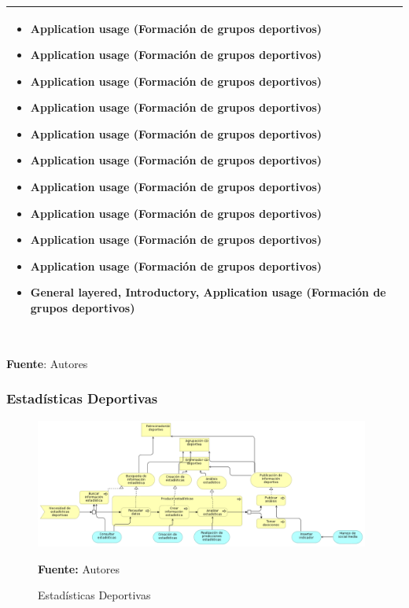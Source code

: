 \begin{table}[!htb]
\begin{center}
{\begin{tabular}{|p{7cm}|p{4cm}|}
\begin{itemize}
				\item Application usage (Formación de grupos deportivos)
				\item Application usage (Formación de grupos deportivos)
				\item Application usage (Formación de grupos deportivos)
				\item Application usage (Formación de grupos deportivos)
				\item Application usage (Formación de grupos deportivos)
				\item Application usage (Formación de grupos deportivos)
				\item Application usage (Formación de grupos deportivos)
				\item Application usage (Formación de grupos deportivos)
				\item Application usage (Formación de grupos deportivos)
				\item Application usage (Formación de grupos deportivos)
				\item General layered, Introductory, Application usage (Formación de grupos deportivos)
			\end{itemize}
			\\
			\hline
		\end{tabular}
		} \\
		\textbf{Fuente}: Autores
	\end{center}
\end{table}

\subsubsection{Estadísticas Deportivas}

\begin{figure}[!htb]
  \begin{center}
    \includegraphics[width=11cm]{./imagenes/business_process/estadisticasdeportivas.png}
    \caption{Estadísticas Deportivas}
    \label{fig:bp_estadisticas_deportivo}
    \textbf{Fuente:}  Autores
  \end{center}
\end{figure}

